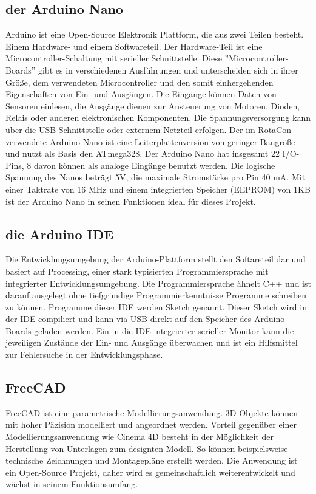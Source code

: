 \documentclass[11pt, titlepage, fleqn]{report}
\begin{document}
			\subsection{der Arduino Nano}
			\label{sec:Nano}
				Arduino ist eine Open-Source Elektronik Plattform, die aus zwei Teilen besteht. Einem Hardware- und einem Softwareteil. Der Hardware-Teil ist eine Microcontroller-Schaltung mit serieller Schnittstelle. Diese ''Microcontroller-Boards'' gibt es in verschiedenen Ausführungen und unterscheiden sich in ihrer Größe, dem verwendeten Microcontroller und den somit einhergehenden Eigenschaften von Ein- und Ausgängen. Die Eingänge können Daten von Sensoren einlesen, die Ausgänge dienen zur Ansteuerung von Motoren, Dioden,	Relais oder anderen elektronischen Komponenten. Die Spannungsversorgung kann über die USB-Schnittstelle oder externem Netzteil erfolgen. Der im RotaCon verwendete Arduino Nano ist eine Leiterplattenversion von geringer Baugröße und nutzt als Basis den ATmega328. Der Arduino Nano hat insgesamt 22 I/O-Pins, 8 davon können als analoge Eingänge benutzt werden. Die logische Spannung des Nanos beträgt 5V, die maximale Stromstärke pro Pin 40 mA. Mit einer Taktrate von 16 MHz und einem integrierten Speicher (EEPROM) von 1KB ist der Arduino Nano in seinen Funktionen ideal für dieses Projekt.
			\subsection{die Arduino IDE}
			\label{sec:Arduino IDE}
				Die Entwicklungsumgebung der Arduino-Plattform stellt den Softareteil dar und basiert auf Processing, einer stark typisierten Programmiersprache mit integrierter Entwicklungsumgebung. Die Programmiersprache ähnelt C++ und ist darauf ausgelegt ohne tiefgründige Programmierkenntnisse Programme schreiben zu können. Programme dieser IDE werden Sketch genannt. Dieser Sketch wird in der IDE compiliert und kann via USB direkt auf den Speicher des Arduino-Boards geladen werden. Ein in die IDE integrierter serieller Monitor kann die jeweiligen Zustände der Ein- und Ausgänge überwachen und ist ein Hilfsmittel zur Fehlersuche in der Entwicklungsphase.
			\subsection{FreeCAD}
			\label{sec:FreeCAD}
				FreeCAD ist eine parametrische Modellierungsanwendung. 3D-Objekte können mit hoher Päzision modelliert und angeordnet werden. Vorteil gegenüber einer Modellierungsanwendung wie Cinema 4D besteht in der Möglichkeit der Herstellung von Unterlagen zum designten Modell. So können beispielsweise technische Zeichnungen und Montagepläne erstellt werden. Die Anwendung ist ein Open-Source Projekt, daher wird es gemeinschaftlich weiterentwickelt und wächst in seinem Funktionsumfang.
\end{document}
